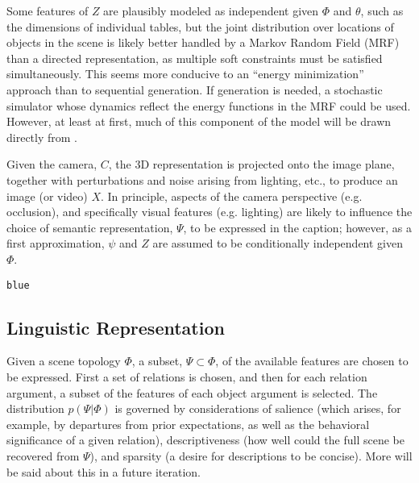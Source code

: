 \documentclass[12pt]{article}
\begin{document}
Some features of $Z$ are plausibly modeled as independent given $\Phi$ and $\theta$, such as the dimensions of individual tables, but the joint distribution over locations of objects in the scene is likely better handled by a Markov Random Field (MRF) than a directed representation, as multiple soft constraints must be satisfied simultaneously.  This seems more conducive to an ``energy minimization'' approach than to sequential generation.  If generation is needed, a stochastic simulator whose dynamics reflect the energy functions in the MRF could be used.  However, at least at first, much of this component of the model will be drawn directly from \cite{delpero2012bayesian}.

Given the camera, $C$, the 3D representation is projected onto the image plane, together with perturbations and noise arising from lighting, etc., to produce an image (or video) $X$.  In principle, aspects of the camera perspective (e.g. occlusion), and specifically visual features (e.g. lighting) are likely to influence the choice of semantic representation, $\Psi$, to be expressed in the caption; however, as a first approximation, $\psi$ and $Z$ are assumed to be conditionally independent given $\Phi$.

\begin{verbatim}
blue 
\end{verbatim}

\subsection{Linguistic Representation}
\label{sec:ling-repr}

Given a scene topology $\Phi$, a subset, $\Psi \subset \Phi$, of the available features are chosen to be expressed.  First a set of relations is chosen, and then for each relation argument, a subset of the features of each object argument is selected.  The distribution $p(\Psi \vert \Phi)$ is governed by considerations of salience (which arises, for example, by departures from prior expectations, as well as the behavioral significance of a given relation), descriptiveness (how well could the full scene be recovered from $\Psi$), and sparsity (a desire for descriptions to be concise).  More will be said about this in a future iteration.
\end{document}

